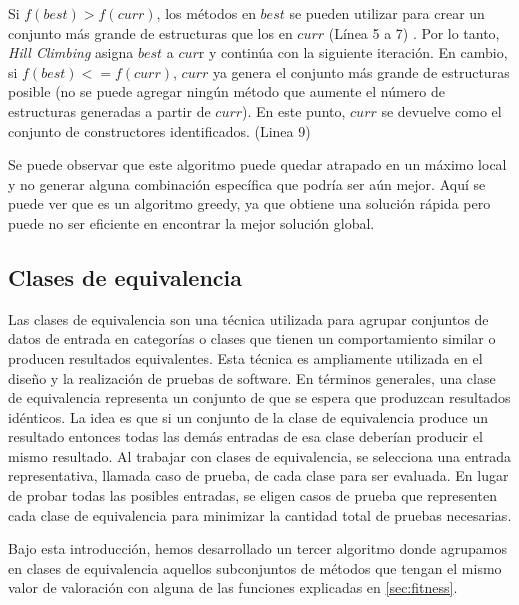 Si $f(best) > f(curr)$, los métodos en $best$ se pueden utilizar para crear un
conjunto más grande de estructuras que los en $curr$ (Línea 5 a 7) . Por lo tanto, \emph{Hill Climbing} asigna $best$ a $cur$r y continúa con la siguiente iteración. En cambio, si $f(best) <= f(curr)$, $curr$ ya genera el conjunto más grande de estructuras posible (no se puede agregar ningún método que aumente el número de estructuras generadas a partir de $curr$). En este punto, $curr$ se devuelve como el conjunto de constructores identificados. (Linea 9) 


Se puede observar que este algoritmo puede quedar atrapado en un máximo local y
no generar alguna combinación específica que podría ser aún mejor. Aquí se puede
ver que es un algoritmo greedy, ya que obtiene una solución rápida pero puede no
ser eficiente  en encontrar la mejor solución global. 


\subsection{Clases de equivalencia}
\label{alg:approachCE}
 Las clases de equivalencia son una técnica utilizada para agrupar conjuntos de datos de entrada en categorías o clases que tienen un comportamiento similar o producen resultados equivalentes. Esta técnica es ampliamente utilizada en el diseño y la realización de pruebas de software.
 En términos generales, una clase de equivalencia representa  un conjunto de que se espera que produzcan resultados idénticos. La idea es que si un conjunto de la clase de equivalencia produce un resultado entonces todas las demás entradas de esa clase deberían producir el mismo resultado.
 Al trabajar con clases de equivalencia, se selecciona una entrada representativa, llamada caso de prueba, de cada clase para ser evaluada. En lugar de probar todas las posibles entradas, se eligen casos de prueba que representen cada clase de equivalencia para minimizar la cantidad total de pruebas necesarias.

 Bajo esta introducción, hemos desarrollado un tercer algoritmo donde agrupamos en clases de equivalencia aquellos subconjuntos de métodos que tengan el mismo valor de valoración con alguna de las funciones explicadas en \ref{sec:fitness}.


